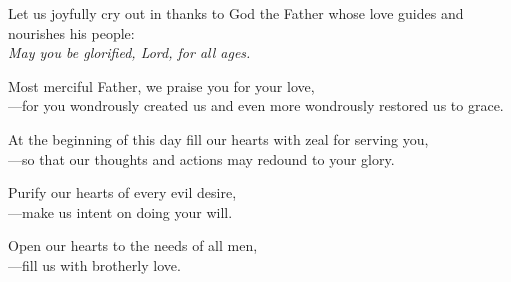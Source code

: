\intercessions

\begin{raggedright}
Let us joyfully cry out in thanks to God the Father whose love guides and nourishes his people:\\
\emph{May you be glorified, Lord, for all ages.}

\medskip
Most merciful Father, we praise you for your love,\\
{\color{red}---}for you wondrously created us and even more wondrously restored us to grace.

\medskip
At the beginning of this day fill our hearts with zeal for serving you,\\
{\color{red}---}so that our thoughts and actions may redound to your glory.

\medskip
Purify our hearts of every evil desire,\\
{\color{red}---}make us intent on doing your will.

\medskip
Open our hearts to the needs of all men,\\
{\color{red}---}fill us with brotherly love.
\end{raggedright}